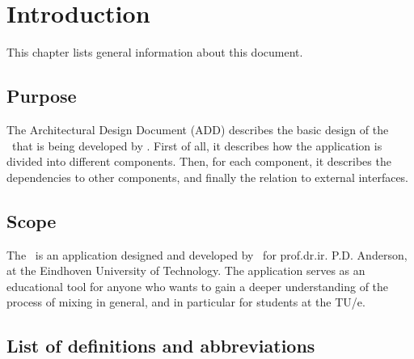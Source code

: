 \chapter{Introduction}

This chapter lists general information about this document.

\section{Purpose}
The Architectural Design Document (ADD) describes the basic design of the \applicationname\ that is being developed by \projectauthor. First of all, it describes how the application is divided into different components. Then, for each component, it describes the dependencies to other components, and finally the relation to external interfaces.

\section{Scope}
The \applicationname\ is an application designed and developed by \projectauthor\ for prof.dr.ir. P.D. Anderson, at the Eindhoven University of Technology. The application serves as an educational tool for anyone who wants to gain a deeper understanding of the process of mixing in general, and in particular for students at the TU/e.

\section{List of definitions and abbreviations}
